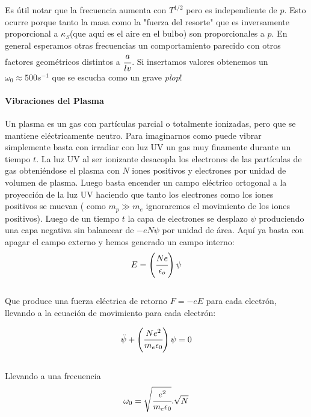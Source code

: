 \documentclass[a4paper,spanish]{article}
\numberwithin{equation}{section}
\begin{document}
Es \'util notar que la frecuencia aumenta con $T^{1/2}$ pero es independiente de $p$. Esto ocurre porque tanto la masa como la "fuerza del resorte" que es inversamente proporcional a $\kappa_S$(que aqu\'i es el aire en el bulbo) son proporcionales a $p$. En general esperamos otras frecuencias un comportamiento parecido con otros factores geom\'etricos distintos a $\cfrac{a}{lv}$. Si insertamos valores obtenemos un $\omega_0 \approx 500 s^{-1}$ que se escucha como un grave \textit{plop}!

\paragraph{Vibraciones del Plasma}
 Un plasma es un gas con part\'iculas parcial o totalmente ionizadas, pero que se mantiene el\'ectricamente neutro. Para imaginarnos como puede vibrar simplemente basta con irradiar con luz UV un gas muy finamente durante un tiempo $t$. La luz UV al ser ionizante desacopla los electrones de las part\'iculas de gas obteni\'endose el plasma con $N$ iones positivos y electrones por unidad de volumen de plasma. Luego basta encender un campo el\'ectrico ortogonal a la proyecci\'on de la luz UV haciendo que tanto los electrones como los iones positivos se muevan ( como $m_p\gg m_e$ ignoraremos el movimiento de los iones positivos). Luego de un tiempo $t$ la capa de electrones se desplazo $\psi$ produciendo una capa negativa sin balancear de $-eN\psi$ por unidad de \'area. Aqu\'i ya basta con apagar el campo externo y hemos generado un campo interno:
\[E=\left(\cfrac{Ne}{\epsilon_o}\right)\psi\]\\
Que produce una fuerza el\'ectrica de retorno $F=-eE$ para cada electr\'on, llevando a la ecuaci\'on de movimiento para cada electr\'on:

\[\ddot{\psi} + \left(\cfrac{Ne^2}{m_e\epsilon_0}\right)\psi=0\]	
\\Llevando a una frecuencia
\begin{equation}
	\omega_0 = \sqrt{\cfrac{e^2}{m_e\epsilon_0}}.\sqrt{N}
	\label{frecuencia_plasma_simple}
\end{equation}
\end{document}
